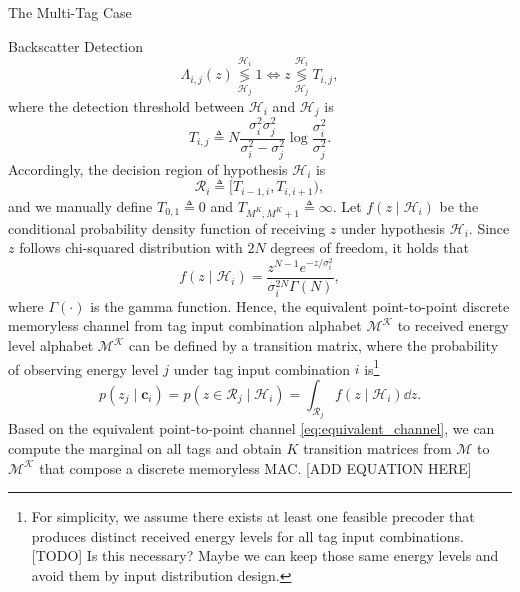 \documentclass[journal]{IEEEtran}
\begin{document}
\begin{section}{The Multi-Tag Case}
\begin{subsection}{Backscatter Detection}
			\begin{equation}
				\Lambda_{i,j}(z) \underset{\mathcal{H}_j}{\overset{\mathcal{H}_i}{\lessgtr}} 1 \iff z \underset{\mathcal{H}_j}{\overset{\mathcal{H}_i}{\lessgtr}} T_{i,j},
				\label{eq:decision_rule}
			\end{equation}
			where the detection threshold between $\mathcal{H}_i$ and $\mathcal{H}_j$ is
			\begin{equation}
				T_{i,j} \triangleq N \frac{\sigma_i^2 \sigma_j^2}{\sigma_i^2 - \sigma_j^2} \log \frac{\sigma_i^2}{\sigma_j^2}.
				\label{eq:detection_threshold}
			\end{equation}
			Accordingly, the decision region of hypothesis $\mathcal{H}_i$ is
			\begin{equation}
				\mathcal{R}_i \triangleq [T_{i-1, i}, T_{i, i+1}),
				\label{eq:decision_region}
			\end{equation}
			and we manually define $T_{0,1} \triangleq 0$ and $T_{M^K,M^K+1} \triangleq \infty$. Let $f(z \mid \mathcal{H}_i)$ be the conditional probability density function of receiving $z$ under hypothesis $\mathcal{H}_i$. Since $z$ follows chi-squared distribution with $2N$ degrees of freedom, it holds that
			\begin{equation}
				f(z \mid \mathcal{H}_i) = \frac{z^{N-1} e^{-z/\sigma_i^2}}{\sigma_i^{2N} \Gamma(N)},
				\label{eq:energy_distribution}
			\end{equation}
			where $\Gamma(\cdot)$ is the gamma function. Hence, the equivalent point-to-point discrete memoryless channel from tag input combination alphabet $\mathcal{M^K}$ to received energy level alphabet $\mathcal{M^K}$ can be defined by a transition matrix, where the probability of observing energy level $j$ under tag input combination $i$ is\footnote{For simplicity, we assume there exists at least one feasible precoder that produces distinct received energy levels for all tag input combinations. [TODO] Is this necessary? Maybe we can keep those same energy levels and avoid them by input distribution design.}
			\begin{equation}
				p(z_j \mid \boldsymbol{c}_i) = p(z \in \mathcal{R}_j \mid \mathcal{H}_i) = \int_{\mathcal{R}_j} f(z \mid \mathcal{H}_i) \dd z.
				\label{eq:equivalent_channel}
			\end{equation}
			Based on the equivalent point-to-point channel \eqref{eq:equivalent_channel}, we can compute the marginal on all tags and obtain $K$ transition matrices from $\mathcal{M}$ to $\mathcal{M^K}$ that compose a discrete memoryless MAC. [ADD EQUATION HERE]


\end{subsection}
\end{section}
\end{document}
